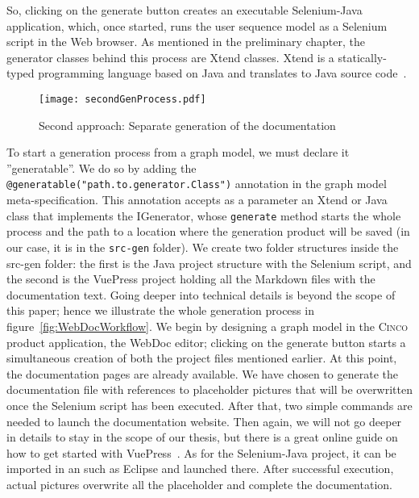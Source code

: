 So, clicking on the generate button creates an executable Selenium-Java application, which, once started, runs the user sequence model as a Selenium script in the Web browser. As mentioned in the preliminary chapter, the generator classes behind this process are Xtend classes. Xtend is a statically-typed programming language based on Java and translates to Java source code~\cite{Xtend}. 

\begin{figure}[h]
    \centering
    \texttt{[image: secondGenProcess.pdf]}
    \caption{Second approach: Separate generation of the documentation}
    \label{fig:secondGenProcess}
\end{figure}

To start a generation process from a graph model, we must declare it ''generatable''. We do so by adding the \lstinline[language=MGL]{@generatable("path.to.generator.Class")} annotation in the graph model meta-specification. This annotation accepts as a parameter an Xtend or Java class that implements the IGenerator, whose \lstinline{generate} method starts the whole process and the path to a location where the generation product will be saved (in our case, it is in the \lstinline{src-gen} folder). We create two folder structures inside the src-gen folder: the first is the Java project structure with the Selenium script, and the second is the VuePress project holding all the Markdown files with the documentation text. Going deeper into technical details is beyond the scope of this paper; hence we illustrate the whole generation process in figure~\ref{fig:WebDocWorkflow}.
We begin by designing a graph model in the \textsc{Cinco} product application, the WebDoc editor; clicking on the generate button starts a simultaneous creation of both the project files mentioned earlier. At this point, the documentation pages are already available. We have chosen to generate the documentation file with references to placeholder pictures that will be overwritten once the Selenium script has been executed. After that, two simple commands are needed to launch the documentation website. Then again, we will not go deeper in details to stay in the scope of our thesis, but there is a great online guide on how to get started with VuePress~\cite{vuepress}. As for the Selenium-Java project, it can be imported in an  such as Eclipse and launched there. After successful execution, actual pictures overwrite all the placeholder and complete the documentation.